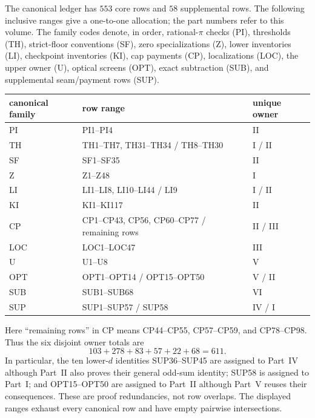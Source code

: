 \documentclass[11pt]{article}
\begin{document}
The canonical ledger has \(553\) core rows and \(58\) supplemental rows.
The following inclusive ranges give a one-to-one allocation; the part numbers
refer to this volume.  The family codes denote, in order, rational-\(\pi\)
checks (PI), thresholds (TH), strict-floor conventions (SF), zero
specializations (Z), lower inventories (LI), checkpoint inventories (KI),
cap payments (CP), localizations (LOC), the upper owner (U), optical screens
(OPT), exact subtraction (SUB), and supplemental seam/payment rows (SUP).
\begin{center}
\small
\begin{tabular}{@{}lll@{}}
\toprule
canonical family&row range&unique owner\\
\midrule
PI&PI1--PI4&II\\
TH&TH1--TH7, TH31--TH34 / TH8--TH30&I / II\\
SF&SF1--SF35&II\\
Z&Z1--Z48&I\\
LI&LI1--LI8, LI10--LI44 / LI9&I / II\\
KI&KI1--KI117&II\\
CP&CP1--CP43, CP56, CP60--CP77 / remaining rows&II / III\\
LOC&LOC1--LOC47&III\\
U&U1--U8&V\\
OPT&OPT1--OPT14 / OPT15--OPT50&V / II\\
SUB&SUB1--SUB68&VI\\
SUP&SUP1--SUP57 / SUP58&IV / I\\
\bottomrule
\end{tabular}
\end{center}
Here ``remaining rows'' in CP means CP44--CP55, CP57--CP59, and
CP78--CP98.  Thus the six disjoint owner totals are
\[
 103+278+83+57+22+68=611.
\]
In particular, the ten lower-\(d\) identities SUP36--SUP45 are assigned to
Part~IV although Part~II also proves their general odd-sum identity; SUP58
is assigned to Part~I; and OPT15--OPT50 are assigned to Part~II although
Part~V reuses their consequences.  These are proof redundancies, not row
overlaps.  The displayed ranges exhaust every canonical row and have empty
pairwise intersections.

\tableofcontents
\clearpage




\end{document}
